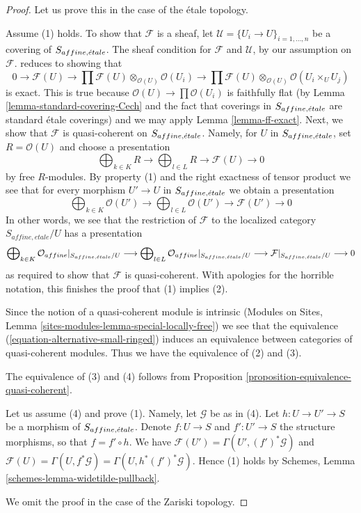 \begin{proof}
Let us prove this in the case of the \'etale topology.

\medskip\noindent
Assume (1) holds. To show that $\mathcal{F}$ is a sheaf, let
$\mathcal{U} = \{U_i \to U\}_{i = 1, \ldots, n}$ be a covering
of $S_{affine, {\acute{e}tale}}$. The sheaf condition for $\mathcal{F}$
and $\mathcal{U}$, by our assumption on $\mathcal{F}$.
reduces to showing that
$$
0 \to \mathcal{F}(U) \to
\prod \mathcal{F}(U) \otimes_{\mathcal{O}(U)} \mathcal{O}(U_i) \to
\prod \mathcal{F}(U) \otimes_{\mathcal{O}(U)} \mathcal{O}(U_i \times_U U_j)
$$
is exact. This is true because $\mathcal{O}(U) \to \prod \mathcal{O}(U_i)$
is faithfully flat (by Lemma \ref{lemma-standard-covering-Cech} and
the fact that coverings in $S_{affine, {\acute{e}tale}}$ are standard \'etale
coverings) and we may apply Lemma \ref{lemma-ff-exact}.
Next, we show that $\mathcal{F}$ is quasi-coherent on $S_{affine, {\acute{e}tale}}$.
Namely, for $U$ in $S_{affine, {\acute{e}tale}}$, set $R = \mathcal{O}(U)$
and choose a presentation
$$
\bigoplus\nolimits_{k \in K} R
\longrightarrow
\bigoplus\nolimits_{l \in L} R
\longrightarrow
\mathcal{F}(U)
\longrightarrow 0
$$
by free $R$-modules. By property (1) and the right exactness of tensor product
we see that for every morphism $U' \to U$ in $S_{affine, {\acute{e}tale}}$
we obtain a presentation
$$
\bigoplus\nolimits_{k \in K} \mathcal{O}(U')
\longrightarrow
\bigoplus\nolimits_{l \in L} \mathcal{O}(U')
\longrightarrow
\mathcal{F}(U')
\longrightarrow 0
$$
In other words, we see that the restriction of $\mathcal{F}$
to the localized category $S_{affine, etale}/U$ has a presentation
$$
\bigoplus\nolimits_{k \in K} \mathcal{O}_{affine}|_{S_{affine, {\acute{e}tale}}/U}
\longrightarrow
\bigoplus\nolimits_{l \in L} \mathcal{O}_{affine}|_{S_{affine, {\acute{e}tale}}/U}
\longrightarrow
\mathcal{F}|_{S_{affine, {\acute{e}tale}}/U}
\longrightarrow 0
$$
as required to show that $\mathcal{F}$ is quasi-coherent.
With apologies for the horrible notation, this finishes the proof
that (1) implies (2).

\medskip\noindent
Since the notion of a quasi-coherent module is intrinsic
(Modules on Sites, Lemma \ref{sites-modules-lemma-special-locally-free})
we see that the equivalence (\ref{equation-alternative-small-ringed})
induces an equivalence between categories of quasi-coherent modules.
Thus we have the equivalence of (2) and (3).

\medskip\noindent
The equivalence of (3) and (4) follows from
Proposition \ref{proposition-equivalence-quasi-coherent}.

\medskip\noindent
Let us assume (4) and prove (1). Namely, let
$\mathcal{G}$ be as in (4). Let $h : U \to U' \to S$ be a morphism
of $S_{affine, {\acute{e}tale}}$. Denote $f : U \to S$ and $f' : U' \to S$ the
structure morphisms, so that $f = f' \circ h$.
We have $\mathcal{F}(U') = \Gamma(U', (f')^*\mathcal{G})$ and
$\mathcal{F}(U) = \Gamma(U, f^*\mathcal{G}) = \Gamma(U, h^*(f')^*\mathcal{G})$.
Hence (1) holds by Schemes, Lemma \ref{schemes-lemma-widetilde-pullback}.

\medskip\noindent
We omit the proof in the case of the Zariski topology.
\end{proof}





